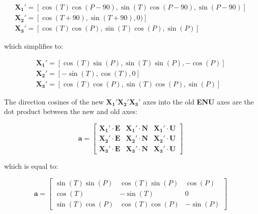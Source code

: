 \documentclass[a4paper , 12pt]{book}
\begin{document}
\begin{gather*}
    \mathbf{X_1\text{$'$}} = [\cos(T)\cos(P-90),\sin(T)\cos(P-90),\sin(P-90)] \\
    \mathbf{X_2\text{$'$}} = [\cos(T+90),\sin(T+90),0)] \\
    \mathbf{X_3\text{$'$}} = [\cos(T)\cos(P),\sin(T)\cos(P),\sin(P)]
\end{gather*}

which simplifies to:

\begin{equation}
    \begin{split}
        \mathbf{X_1\text{$'$}} = [\cos(T)\sin(P),\sin(T)\sin(P),-\cos(P)]  \\
        \mathbf{X_2\text{$'$}} = [-\sin(T),\cos(T),0] \hspace{40pt} \\
        \mathbf{X_3\text{$'$}} = [\cos(T)\cos(P),\sin(T)\cos(P),\sin(P)]
    \end{split}
\end{equation}

The direction cosines of the new $\mathbf{X_1\text{$'$}}\mathbf{X_2\text{$'$}}\mathbf{X_3\text{$'$}}$ axes into the old \textbf{ENU} axes are the dot product between the new and old axes:

\begin{equation*}
    \textbf{a}=
    \begin{bmatrix}
    \mathbf{X_1\text{$'$}}\cdot\mathbf{E} & \mathbf{X_1\text{$'$}}\cdot\mathbf{N} & \mathbf{X_1\text{$'$}}\cdot\mathbf{U} \\
    \mathbf{X_2\text{$'$}}\cdot\mathbf{E} & \mathbf{X_2\text{$'$}}\cdot\mathbf{N} & \mathbf{X_2\text{$'$}}\cdot\mathbf{U} \\
    \mathbf{X_3\text{$'$}}\cdot\mathbf{E} & \mathbf{X_3\text{$'$}}\cdot\mathbf{N} & \mathbf{X_3\text{$'$}}\cdot\mathbf{U}
\end{bmatrix}
\end{equation*}

which is equal to:

\begin{equation}
    \textbf{a}=
    \begin{bmatrix}
    \sin(T)\sin(P) & \cos(T)\sin(P) & \cos(P) \\
    \cos(T) & -\sin(T) & 0 \\
    \sin(T)\cos(P) & \cos(T)\cos(P) & -\sin(P)
\end{bmatrix}
\end{equation}
\end{document}
